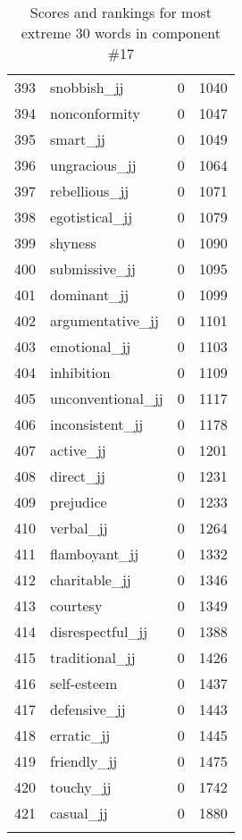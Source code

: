 \begin{longtable}[!htbp]{| rlr@{.}l |}
    393 & snobbish\_jj & 0 & 1040 \\
    394 & nonconformity & 0 & 1047 \\
    395 & smart\_jj & 0 & 1049 \\
    396 & ungracious\_jj & 0 & 1064 \\
    397 & rebellious\_jj & 0 & 1071 \\
    398 & egotistical\_jj & 0 & 1079 \\
    399 & shyness & 0 & 1090 \\
    400 & submissive\_jj & 0 & 1095 \\
    401 & dominant\_jj & 0 & 1099 \\
    402 & argumentative\_jj & 0 & 1101 \\
    403 & emotional\_jj & 0 & 1103 \\
    404 & inhibition & 0 & 1109 \\
    405 & unconventional\_jj & 0 & 1117 \\
    406 & inconsistent\_jj & 0 & 1178 \\
    407 & active\_jj & 0 & 1201 \\
    408 & direct\_jj & 0 & 1231 \\
    409 & prejudice & 0 & 1233 \\
    410 & verbal\_jj & 0 & 1264 \\
    411 & flamboyant\_jj & 0 & 1332 \\
    412 & charitable\_jj & 0 & 1346 \\
    413 & courtesy & 0 & 1349 \\
    414 & disrespectful\_jj & 0 & 1388 \\
    415 & traditional\_jj & 0 & 1426 \\
    416 & self-esteem & 0 & 1437 \\
    417 & defensive\_jj & 0 & 1443 \\
    418 & erratic\_jj & 0 & 1445 \\
    419 & friendly\_jj & 0 & 1475 \\
    420 & touchy\_jj & 0 & 1742 \\
    421 & casual\_jj & 0 & 1880 \\
    \hline
    \caption{Scores and rankings for most extreme 30 words in component \#17} \\
\end{longtable}
